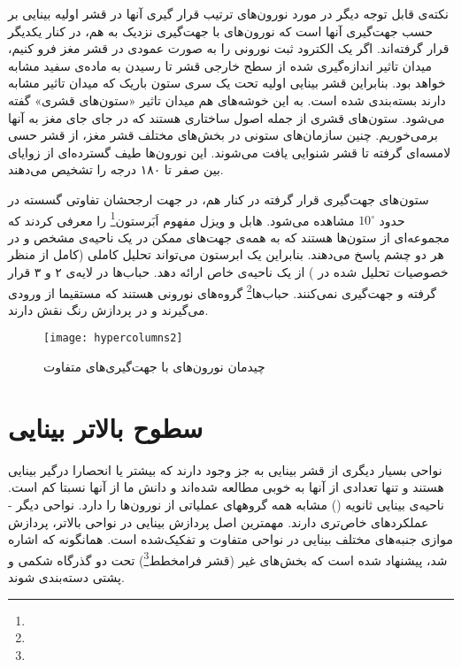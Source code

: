 نکته‌ی قابل توجه دیگر در مورد نورون‌های  ترتیب قرار گیری آنها در قشر اولیه بینایی بر حسب جهت‌گیری آنها است که نورون‌های با جهت‌گیری نزدیک به هم، در کنار یکدیگر قرار گرفته‌اند\cite{hubel1969anatomical}. اگر یک الکترود ثبت نورونی را به صورت عمودی در قشر مغز فرو کنیم، میدان تاثیر اندازه‌گیری شده از سطح خارجی قشر تا رسیدن به ماده‌ی سفید مشابه خواهد بود. بنابراین قشر بینایی اولیه تحت یک سری ستون باریک که میدان تاثیر مشابه دارند بسته‌بندی شده است\cite{goebel2004visual}. به این خوشه‌های هم میدان تاثیر «ستون‌های قشری» گفته می‌شود\cite{hubel1977ferrier}. ستون‌های قشری از جمله اصول ساختاری هستند که در جای جای مغز به آنها برمی‌خوریم. چنین سازمان‌های ستونی در بخش‌های مختلف قشر مغز، از قشر حسی لامسه‌ای گرفته تا قشر شنوایی یافت می‌شوند. این نورون‌ها طیف گسترده‌ای از زوایای بین صفر تا ۱۸۰ درجه را تشخیص می‌دهند. 

ستون‌های جهت‌گیری قرار گرفته در کنار هم، در جهت ارجحشان تفاوتی گسسته در حدود $10^\circ$ مشاهده می‌شود. هابل و ویزل مفهوم اَبَرستون\footnote{} را معرفی کردند که مجموعه‌ای از ستون‌ها هستند که به همه‌ی جهت‌های ممکن در یک ناحیه‌ی مشخص و در هر دو چشم پاسخ می‌دهند‌. بنابراین یک ابرستون می‌تواند تحلیل کاملی (کامل از منظر خصوصیات تحلیل شده در ) از یک ناحیه‌ی خاص ارائه دهد. 
حباب‌ها در لایه‌ی ۲ و ۳ قرار گرفته و جهت‌گیری نمی‌کنند. حباب‌ها\footnote{} گروه‌های نورونی هستند که مستقیما از  ورودی می‌گیرند و در پردازش رنگ نقش دارند. 



\begin{figure}
\centering
{\footnotesize
\texttt{[image: hypercolumns2]}
\caption[چیدمان نورون‌های  با جهت‌گیری‌های متفاوت]{چیدمان نورون‌های  با جهت‌گیری‌های متفاوت\cite{goebel2004visual}}
\label{fig:hypercolumns2}
}
\end{figure}

\section{سطوح بالاتر بینایی}
نواحی بسیار دیگری از قشر بینایی به جز  وجود دارند که بیشتر یا انحصارا درگیر بینایی هستند و تنها تعدادی از آنها به خوبی مطالعه شده‌اند و دانش ما از آنها نسبتا کم است. ناحیه‌ی بینایی ثانویه ()‌ مشابه  همه گروههای عملیاتی از نورون‌ها را دارد. نواحی دیگر - عملکرد‌های خاص‌تری دارند. مهمترین اصل پردازش بینایی در نواحی بالاتر، پردازش موازی جنبه‌های مختلف بینایی در نواحی متفاوت و تفکیک‌شده است. همانگونه که اشاره شد، پیشنهاد شده است که بخش‌های غیر  (قشر فرامخطط\footnote{}) تحت دو گذرگاه شکمی و پشتی دسته‌بندی شوند. 

